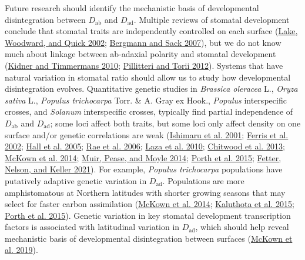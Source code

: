 \documentclass[
  10pt,
]{article}
\begin{document}
Future research should identify the mechanistic basis of developmental disintegration between \(D_\text{ab}\) and \(D_\text{ad}\). Multiple reviews of stomatal development conclude that stomatal traits are independently controlled on each surface (\protect\hyperlink{ref-lake_longdistance_2002}{Lake, Woodward, and Quick 2002}; \protect\hyperlink{ref-bergmann_stomatal_2007}{Bergmann and Sack 2007}), but we do not know much about linkage between ab-adaxial polarity and stomatal development (\protect\hyperlink{ref-kidner_signaling_2010}{Kidner and Timmermans 2010}; \protect\hyperlink{ref-pillitteri_mechanisms_2012}{Pillitteri and Torii 2012}). Systems that have natural variation in stomatal ratio should allow us to study how developmental disintegration evolves. Quantitative genetic studies in \emph{Brassica oleracea} L., \emph{Oryza sativa} L., \emph{Populus trichocarpa} Torr. \& A. Gray ex Hook., \emph{Populus} interspecific crosses, and \emph{Solanum} interspecific crosses, typically find partial independence of \(D_\text{ab}\) and \(D_\text{ad}\); some loci affect both traits, but some loci only affect density on one surface and/or genetic correlations are weak (\protect\hyperlink{ref-ishimaru_identification_2001}{Ishimaru et al. 2001}; \protect\hyperlink{ref-ferris_leaf_2002}{Ferris et al. 2002}; \protect\hyperlink{ref-hall_relationships_2005}{Hall et al. 2005}; \protect\hyperlink{ref-rae_elucidating_2006}{Rae et al. 2006}; \protect\hyperlink{ref-laza_quantitative_2010}{Laza et al. 2010}; \protect\hyperlink{ref-chitwood_quantitative_2013}{Chitwood et al. 2013}; \protect\hyperlink{ref-mckown_association_2014}{McKown et al. 2014}; \protect\hyperlink{ref-muir_quantitative_2014}{Muir, Pease, and Moyle 2014}; \protect\hyperlink{ref-porth_evolutionary_2015}{Porth et al. 2015}; \protect\hyperlink{ref-fetter_growthdefense_2021}{Fetter, Nelson, and Keller 2021}). For example, \emph{Populus trichocarpa} populations have putatively adaptive genetic variation in \(D_\text{ad}\). Populations are more amphistomatous at Northern latitudes with shorter growing seasons that may select for faster carbon assimilation (\protect\hyperlink{ref-mckown_association_2014}{McKown et al. 2014}; \protect\hyperlink{ref-kaluthota_higher_2015}{Kaluthota et al. 2015}; \protect\hyperlink{ref-porth_evolutionary_2015}{Porth et al. 2015}). Genetic variation in key stomatal development transcription factors is associated with latitudinal variation in \(D_\text{ad}\), which should help reveal mechanistic basis of developmental disintegration between surfaces (\protect\hyperlink{ref-mckown_role_2019}{McKown et al. 2019}).
\end{document}
